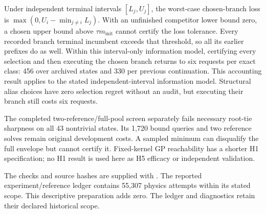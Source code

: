 Under independent terminal intervals $[L_j,U_j]$, the worst-case chosen-branch loss is $\max(0,U_i-\min_{j\ne i}L_j)$. With an unfinished competitor lower bound zero, a chosen upper bound above $\tau m_{\mathrm{init}}$ cannot certify the loss tolerance. Every recorded branch terminal incumbent exceeds that threshold, so all its earlier prefixes do as well. Within this interval-only information model, certifying every selection and then executing the chosen branch returns to six requests per exact class: 456 over archived states and 330 per previous continuation. This accounting result applies to the stated independent-interval information model. Structural alias choices have zero selection regret without an audit, but executing their branch still costs six requests.

The completed two-reference/full-pool screen separately fails necessary root-tie sharpness on all 43 nontrivial states. Its 1,720 bound queries and two reference solves remain original development costs. A sampled minimum can disqualify the full envelope but cannot certify it. Fixed-kernel GP reachability has a shorter H1 specification; no H1 result is used here as H5 efficacy or independent validation.

The checks and source hashes are supplied with . The reported experiment/reference ledger contains 55,307 physics attempts within its stated scope. This descriptive preparation adds zero. The ledger and diagnostics retain their declared historical scope.
